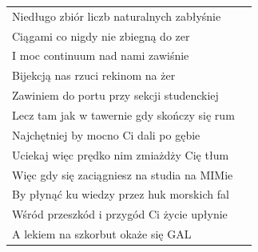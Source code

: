 \documentclass[11pt]{mwrep}
\renewcommand{\[}{\begin{equation}}
\renewcommand{\]}{\end{equation}}
\begin{document}
{\begin{tabular}{ll}
Niedługo zbiór liczb naturalnych zabłyśnie \\ 
Ciągami co nigdy nie zbiegną do zer \\ 
I moc continuum nad nami zawiśnie \\ 
Bijekcją nas rzuci rekinom na żer \vspace{0.8eM}\\ 

Zawiniem do portu przy sekcji studenckiej \\ 
Lecz tam jak w tawernie gdy skończy się rum \\ 
Najchętniej by mocno Ci dali po gębie \\ 
Uciekaj więc prędko nim zmiażdży Cię tłum \vspace{0.8eM}\\ 

Więc gdy się zaciągniesz na studia na MIMie \\ 
By płynąć ku wiedzy przez huk morskich fal \\ 
Wśród przeszkód i przygód Ci życie upłynie \\ 
A lekiem na szkorbut okaże się GAL \\ 
\end{tabular}}
\printindex
\end{document}
